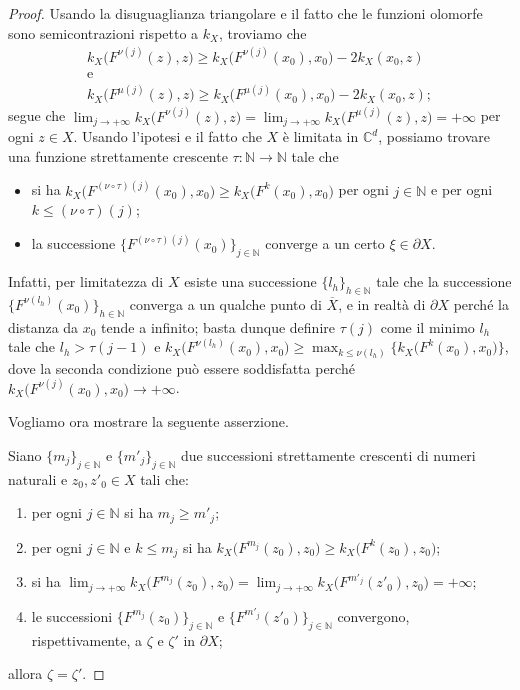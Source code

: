 \begin{proof}
    Usando la disuguaglianza triangolare e il fatto che le funzioni olomorfe sono semicontrazioni rispetto a $k_X$, troviamo che
    \begin{gather*}
        k_X\big(F^{\nu(j)}(z),z\big) \ge k_X\big(F^{\nu(j)}(x_0),x_0\big)-2k_X(x_0,z)\\
        \text{e}\\
        k_X\big(F^{\mu(j)}(z),z\big) \ge k_X\big(F^{\mu(j)}(x_0),x_0\big)-2k_X(x_0,z);
    \end{gather*}
    segue che $\displaystyle\lim_{j\longrightarrow+\infty}k_X\big(F^{\nu(j)}(z),z\big)=\lim_{j\longrightarrow+\infty}k_X\big(F^{\mu(j)}(z),z\big)=+\infty$ per ogni $z \in X$. Usando l'ipotesi e il fatto che $X$ è limitata in $\mathbb{C}^d$, possiamo trovare una funzione strettamente crescente $\tau:\mathbb{N} \longrightarrow \mathbb{N}$ tale che
    \begin{itemize}
        \item si ha $k_X\big(F^{(\nu\circ\tau)(j)}(x_0),x_0\big) \ge k_X\big(F^k(x_0),x_0\big)$ per ogni $j \in \mathbb{N}$ e per ogni $k \le (\nu\circ\tau)(j)$;
        \item la successione $\{F^{(\nu\circ\tau)(j)}(x_0)\}_{j\in\mathbb{N}}$ converge a un certo $\xi\in\partial X$.
    \end{itemize}
    
    Infatti, per limitatezza di $X$ esiste una successione $\{l_h\}_{h\in\mathbb{N}}$ tale che la successione $\{F^{\nu(l_h)}(x_0)\}_{h\in\mathbb{N}}$ converga a un qualche punto di $\overline{X}$, e in realtà di $\partial X$ perché la distanza da $x_0$ tende a infinito; basta dunque definire $\tau(j)$ come il minimo $l_h$ tale che $l_h>\tau(j-1)$ e $k_X\big(F^{\nu(l_h)}(x_0),x_0\big) \ge \max_{k\le\nu(l_h)}\{k_X\big(F^k(x_0),x_0\big)\}$, dove la seconda condizione può essere soddisfatta perché $k_X\big(F^{\nu(j)}(x_0),x_0\big)\longrightarrow+\infty$.

    Vogliamo ora mostrare la seguente asserzione.

    Siano $\{m_j\}_{j\in\mathbb{N}}$ e $\{m'_j\}_{j\in\mathbb{N}}$ due successioni strettamente crescenti di numeri naturali e $z_0,z'_0\in X$ tali che:
    \begin{enumerate}[label={(\arabic*)}]
        \item per ogni $j\in\mathbb{N}$ si ha $m_j \ge m'_j$;
        \item per ogni $j\in\mathbb{N}$ e $k \le m_j$ si ha $k_X\big(F^{m_j}(z_0),z_0\big) \ge k_X\big(F^k(z_0),z_0\big)$;
        \item si ha $\displaystyle\lim_{j\longrightarrow+\infty}k_X\big(F^{m_j}(z_0),z_0\big)=\lim_{j\longrightarrow+\infty}k_X\big(F^{m'_j}(z'_0),z_0\big)=+\infty$;
        \item le successioni $\{F^{m_j}(z_0)\}_{j\in\mathbb{N}}$ e $\{F^{m'_j}(z'_0)\}_{j\in\mathbb{N}}$ convergono, rispettivamente, a $\zeta$ e $\zeta'$ in $\partial X$;
    \end{enumerate}
    allora $\zeta=\zeta'$.


\end{proof}
